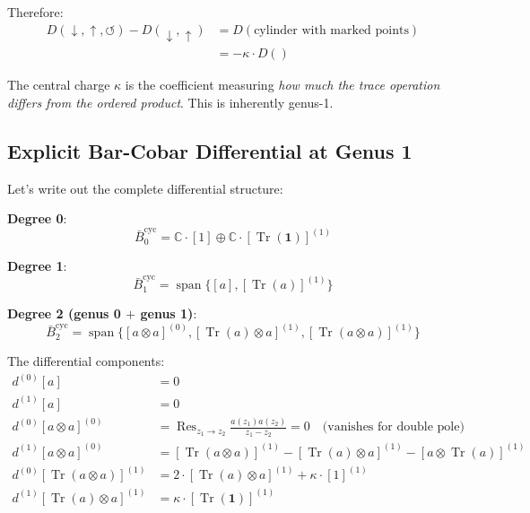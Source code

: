 Therefore:
\begin{align}
D(\downarrow, \uparrow, \circlearrowleft) - D(\downarrow, \uparrow) &= D(\text{cylinder with marked points})\\
&= -\kappa \cdot D()
\end{align}

The central charge $\kappa$ is the coefficient measuring \emph{how much the trace operation differs from the ordered product}. This is inherently genus-1.

\subsection{Explicit Bar-Cobar Differential at Genus 1}

Let's write out the complete differential structure:

\textbf{Degree 0}:
\begin{equation}
\bar{B}^{\text{cyc}}_0 = \mathbb{C} \cdot [1] \oplus \mathbb{C} \cdot [\operatorname{Tr}(\mathbf{1})]^{(1)}
\end{equation}

\textbf{Degree 1}:
\begin{equation}
\bar{B}^{\text{cyc}}_1 = \operatorname{span}\{[a], [\operatorname{Tr}(a)]^{(1)}\}
\end{equation}

\textbf{Degree 2 (genus 0 $+$ genus 1)}:
\begin{equation}
\bar{B}^{\text{cyc}}_2 = \operatorname{span}\{[a \otimes a]^{(0)}, [\operatorname{Tr}(a) \otimes a]^{(1)}, [\operatorname{Tr}(a \otimes a)]^{(1)}\}
\end{equation}

The differential components:
\begin{align}
d^{(0)}[a] &= 0\\
d^{(1)}[a] &= 0\\
d^{(0)}[a \otimes a]^{(0)} &= \operatorname{Res}_{z_1 \to z_2} \frac{a(z_1) a(z_2)}{z_1 - z_2} = 0 \quad \text{(vanishes for double pole)}\\
d^{(1)}[a \otimes a]^{(0)} &= [\operatorname{Tr}(a \otimes a)]^{(1)} - [\operatorname{Tr}(a) \otimes a]^{(1)} - [a \otimes \operatorname{Tr}(a)]^{(1)}\\
d^{(0)}[\operatorname{Tr}(a \otimes a)]^{(1)} &= 2 \cdot [\operatorname{Tr}(a) \otimes a]^{(1)} + \kappa \cdot [1]^{(1)}\\
d^{(1)}[\operatorname{Tr}(a) \otimes a]^{(1)} &= \kappa \cdot [\operatorname{Tr}(\mathbf{1})]^{(1)}
\end{align}

